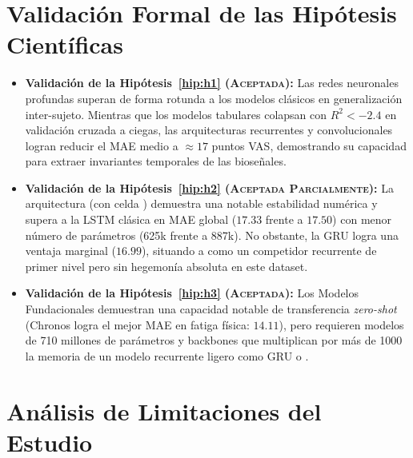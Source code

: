 \section{Validación Formal de las Hipótesis Científicas}
\label{sec:res_validacion_hipotesis}

\begin{itemize}
    \item \textbf{Validación de la Hipótesis~\ref{hip:h1} (\textsc{Aceptada}):} Las redes neuronales profundas superan de forma rotunda a los modelos clásicos en generalización inter-sujeto. Mientras que los modelos tabulares colapsan con $R^2 < -2.4$ en validación cruzada a ciegas, las arquitecturas recurrentes y convolucionales logran reducir el MAE medio a $\approx 17$ puntos VAS, demostrando su capacidad para extraer invariantes temporales de las bioseñales.
    \item \textbf{Validación de la Hipótesis~\ref{hip:h2} (\textsc{Aceptada Parcialmente}):} La arquitectura \xlstm{} (con celda \slstm{}) demuestra una notable estabilidad numérica y supera a la LSTM clásica en MAE global ($17.33$ frente a $17.50$) con menor número de parámetros (625k frente a 887k). No obstante, la GRU logra una ventaja marginal ($16.99$), situando a \xlstm{} como un competidor recurrente de primer nivel pero sin hegemonía absoluta en este dataset.
    \item \textbf{Validación de la Hipótesis~\ref{hip:h3} (\textsc{Aceptada}):} Los Modelos Fundacionales demuestran una capacidad notable de transferencia \textit{zero-shot} (Chronos logra el mejor MAE en fatiga física: $14.11$), pero requieren modelos de 710 millones de parámetros y backbones que multiplican por más de 1000 la memoria de un modelo recurrente ligero como GRU o \xlstm{}.
\end{itemize}


\section{Análisis de Limitaciones del Estudio}
\label{sec:res_limitaciones}

